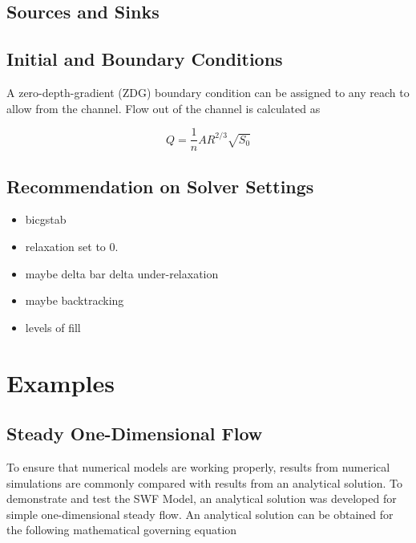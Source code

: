 \documentclass[fleqn]{article}
\begin{document}
\subsection{Sources and Sinks}

\subsection{Initial and Boundary Conditions}

A zero-depth-gradient (ZDG) boundary condition can be assigned to any reach to allow from the channel.  Flow out of the channel is calculated as

\begin{equation}
  Q = \frac{1}{n}A R^{2/3} \sqrt{S_0}
\end{equation}

\subsection{Recommendation on Solver Settings}

\begin{itemize}
  \item bicgstab
  \item relaxation set to 0.
  \item maybe delta bar delta under-relaxation
  \item maybe backtracking
  \item levels of fill
\end{itemize}


\newpage
\section{Examples}


\subsection{Steady One-Dimensional Flow}

To ensure that numerical models are working properly, results from numerical simulations are commonly compared with results from an analytical solution.  To demonstrate and test the SWF Model, an analytical solution was developed for simple one-dimensional steady flow.  An analytical solution can be obtained for the following mathematical governing equation
\end{document}
